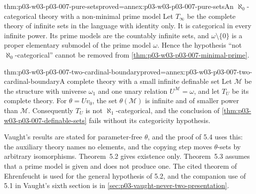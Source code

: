 \begin{hbtheorem}{thm:p03-w03-p03-007-pure-sets}{proved=annex:p03-w03-p03-007-pure-sets}{An \(\aleph_0\)-categorical theory with a non-minimal prime model}
Let \(T_\infty\) be the complete theory of infinite sets in the language
with identity only. It is categorical in every infinite power. Its prime
models are the countably infinite sets, and \(\omega\setminus\{0\}\) is a
proper elementary submodel of the prime model \(\omega\). Hence the
hypothesis ``not \(\aleph_0\)-categorical'' cannot be removed from
\cref{thm:p03-w03-p03-007-minimal-prime}.
\end{hbtheorem}

\begin{hbtheorem}{thm:p03-w03-p03-007-two-cardinal-boundary}{proved=annex:p03-w03-p03-007-two-cardinal-boundary}{A complete theory with a small infinite definable set}
Let \(\mathcal M\) be the structure with universe \(\omega_1\) and one unary
relation \(U^{\mathcal M}=\omega\), and let \(T_U\) be its complete theory.
For \(\theta=Uv_0\), the set \(\theta(\mathcal M)\) is infinite and of
smaller power than \(\mathcal M\). Consequently \(T_U\) is not
\(\aleph_1\)-categorical, and the conclusion of
\cref{thm:p03-w03-p03-007-definable-sets} fails without its categoricity
hypothesis.
\end{hbtheorem}

Vaught's results are stated for parameter-free \(\theta\), and the proof
of 5.4 uses this: the auxiliary theory names no elements, and the copying
step moves \(\theta\)-sets by arbitrary isomorphisms. Theorem~5.2 gives
existence only. Theorem~5.3 assumes that a prime model is given and does not
produce one. The cited theorem of Ehrenfeucht is used for the general
hypothesis of 5.2, and the companion use of 5.1 in Vaught's sixth section is
in \cref{sec:p03-vaught-never-two-presentation}.
